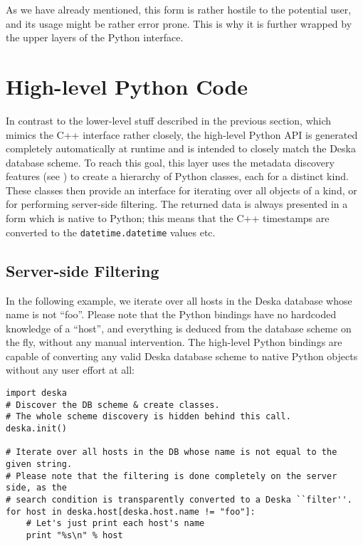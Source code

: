 \documentclass[deska]{subfiles}
\begin{document}
As we have already mentioned, this form is rather hostile to the potential user, and its usage might be rather error
prone.  This is why it is further wrapped by the upper layers of the Python interface.

\section{High-level Python Code}

In contrast to the lower-level stuff described in the previous section, which mimics the C++ interface rather closely,
the high-level Python API is generated completely automatically at runtime and is intended to closely match the Deska
database scheme.  To reach this goal, this layer uses the metadata discovery features (see
) to create a hierarchy of Python classes, each for a distinct kind.  These classes then
provide an interface for iterating over all objects of a kind, or for performing server-side filtering.  The returned
data is always presented in a form which is native to Python; this means that the C++ timestamps are converted to the
{\tt datetime.datetime} values etc.

\subsection{Server-side Filtering}

In the following example, we iterate over all hosts in the Deska database whose name is not ``foo''.  Please note that
the Python bindings have no hardcoded knowledge of a ``host'', and everything is deduced from the database scheme on the
fly, without any manual intervention.  The high-level Python bindings are capable of converting any valid Deska database
scheme to native Python objects without any user effort at all:

\begin{verbatim}
import deska
# Discover the DB scheme & create classes.
# The whole scheme discovery is hidden behind this call.
deska.init()

# Iterate over all hosts in the DB whose name is not equal to the given string.
# Please note that the filtering is done completely on the server side, as the
# search condition is transparently converted to a Deska ``filter''.
for host in deska.host[deska.host.name != "foo"]:
    # Let's just print each host's name
    print "%s\n" % host
\end{verbatim}
\end{document}

